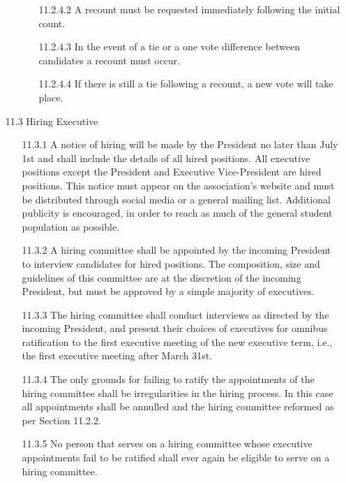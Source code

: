 \documentclass[12pt,a4paper]{article}
\begin{document}
\begin{enumerate}
\begin{enumerate}
\begin{enumerate}
\item[11.2.4.2] A recount must be requested immediately following the initial count.

\item[11.2.4.3] In the event of a tie or a one vote difference between candidates a recount must occur.

\item[11.2.4.4] If there is still a tie following a recount, a new vote will take place.
\end{enumerate}
\end{enumerate}

\item[11.3] Hiring Executive

\begin{enumerate}
\item[11.3.1] A notice of hiring will be made by the President no later than July 1st and shall include the details of all hired positions. All executive positions except the President and Executive Vice-President are hired positions. This notice must appear on the association's website and must be distributed through social media or a general mailing list. Additional publicity is encouraged, in order to reach as much of the general student population as possible.

\item[11.3.2] A hiring committee shall be appointed by the incoming President to interview candidates for hired positions. The composition, size and guidelines of this committee are at the discretion of the incoming President, but must be approved by a simple majority of executives.

\item[11.3.3] The hiring committee shall conduct interviews as directed by the incoming President, and present their choices of executives for omnibus ratification to the first executive meeting of the new executive term, i.e., the first executive meeting after March 31st.

\item[11.3.4] The only grounds for failing to ratify the appointments of the hiring committee shall be irregularities in the hiring process. In this case all appointments shall be annulled and the hiring committee reformed as per Section 11.2.2.

\item[11.3.5] No person that serves on a hiring committee whose executive appointments fail to be ratified shall ever again be eligible to serve on a hiring committee.


\end{enumerate}
\end{enumerate}
\end{document}
